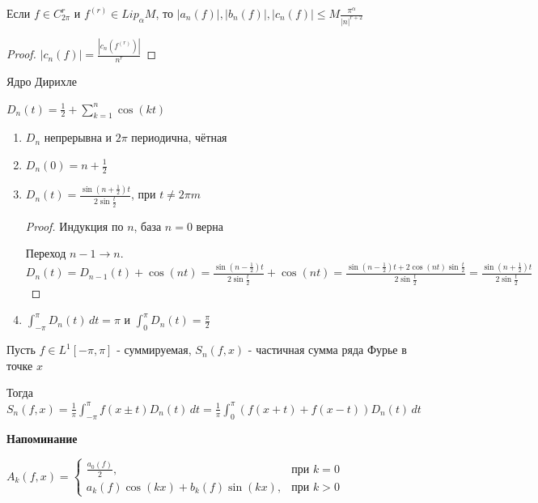 \begin{consequence}
    Если $f \in C_{2\pi}^r$ и $f^{(r)} \in Lip_{\alpha} M$, то $|a_n(f)|, |b_n (f)|, |c_n (f)| \leqslant M \frac{\pi^\alpha}{|n|^{r + 2}}$
\end{consequence}

\begin{proof}
    $|c_n (f)| = \frac{|c_n (f^{(r)})|}{n^r}$
\end{proof}

\begin{definition}
    Ядро Дирихле

    $D_n (t) = \frac{1}{2} + \sum_{k = 1}^n \cos (kt)$
\end{definition}

\begin{properties}
    \begin{enumerate}
        \item $D_n$ непрерывна и $2\pi$ периодична, чётная
        \item $D_n (0) = n + \frac{1}{2}$
        \item {
            $D_n (t) = \frac{\sin (n + \frac{1}{2})t}{2\sin \frac{t}{2}}$, при $t \neq 2\pi m$

            \begin{proof}
                Индукция по $n$, база $n = 0$ верна

                Переход $n - 1 \to n$. $D_{n} (t) = D_{n - 1} (t) + \cos (nt) = \frac{\sin (n - \frac{1}{2})t}{2\sin \frac{t}{2}} + \cos (nt) = \frac{\sin (n - \frac{1}{2})t + 2\cos (nt) \sin \frac{t}{2}}{2\sin \frac{t}{2}} = \frac{\sin (n + \frac{1}{2})t}{2\sin \frac{t}{2}}$
            \end{proof}
        }
        \item $\int_{-\pi}^\pi D_n (t) \, dt = \pi$ и $\int_0^\pi D_n (t) = \frac{\pi}{2}$
    \end{enumerate}
\end{properties}

\begin{lemma}
    Пусть $f \in L^1 [-\pi, \pi]$ - суммируемая, $S_n (f, x)$ - частичная сумма ряда Фурье в точке $x$

    Тогда $S_n (f, x) = \frac{1}{\pi} \int_{-\pi}^\pi f(x \pm t) D_n (t) \, dt = \frac{1}{\pi} \int_0^\pi (f(x + t) + f(x - t)) D_n (t) \, dt$
\end{lemma}

\textbf{Напоминание}

$A_k (f, x) = 
\begin{cases}
    \frac{a_0 (f)}{2}, & \text{при $k = 0$} \\
    a_k (f) \cos (kx) + b_k (f) \sin (kx), & \text{при $k > 0$}
\end{cases}$


